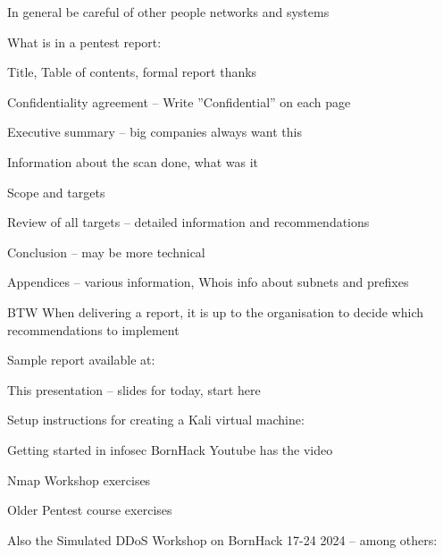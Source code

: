 \documentclass[Screen16to9,17pt]{foils}
\begin{document}
\centerline{In general be careful of other people networks and systems}


\begin{list1}
\item What is in a pentest report:
\begin{list2}
\item Title, Table of contents, formal report thanks
\item Confidentiality agreement – Write ”Confidential” on each page
\item Executive summary – big companies always want this
\item Information about the scan done, what was it
\item Scope and targets
\item Review of all targets – detailed information and recommendations
\item Conclusion – may be more technical
\item Appendices – various information, Whois info about subnets and prefixes
\end{list2}
\item BTW When delivering a report, it is up to the organisation to decide which recommendations to implement
\end{list1}

Sample report available at: 


\begin{list2}
\item This presentation -- slides for today, start here
\item Setup instructions for creating a Kali virtual machine:\\
\item Getting started in infosec BornHack Youtube has the video \\{\footnotesize
{}}
\item Nmap Workshop exercises\\{\footnotesize
{}}
\item Older Pentest course exercises\\{\footnotesize
{}}
\item Also the Simulated DDoS Workshop on BornHack 17-24 2024 -- among others:\\{\footnotesize
{}}
\end{list2}
\end{document}
